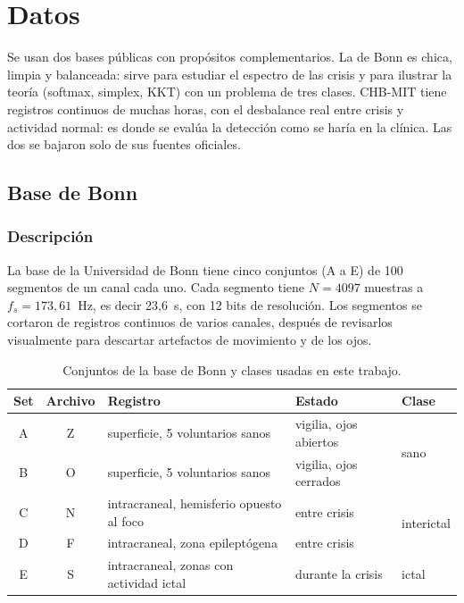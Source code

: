 \chapter{Datos}
\label{cap:datos}

Se usan dos bases públicas con propósitos complementarios. La de Bonn es chica, limpia y balanceada:
sirve para estudiar el espectro de las crisis y para ilustrar la teoría (softmax, simplex, KKT) con un
problema de tres clases. CHB-MIT tiene registros continuos de muchas horas, con el desbalance real entre
crisis y actividad normal: es donde se evalúa la detección como se haría en la clínica. Las dos se bajaron
solo de sus fuentes oficiales.

\section{Base de Bonn}
\label{sec:bonn}

\subsection{Descripción}

La base de la Universidad de Bonn \parencite{andrzejak2001} tiene cinco conjuntos (A a E) de 100 segmentos
de un canal cada uno. Cada segmento tiene $N = 4097$ muestras a $f_s = 173{,}61$~Hz, es decir 23,6~s, con
12 bits de resolución. Los segmentos se cortaron de registros continuos de varios canales, después de
revisarlos visualmente para descartar artefactos de movimiento y de los ojos.

\begin{table}[ht]
\centering
\caption{Conjuntos de la base de Bonn y clases usadas en este trabajo.}
\label{tab:bonn_sets}
\begin{tabular}{cclll}
\toprule
Set & Archivo & Registro & Estado & Clase \\
\midrule
A & Z & superficie, 5 voluntarios sanos & vigilia, ojos abiertos & \multirow{2}{*}{sano} \\
B & O & superficie, 5 voluntarios sanos & vigilia, ojos cerrados & \\
C & N & intracraneal, hemisferio opuesto al foco & entre crisis & \multirow{2}{*}{interictal} \\
D & F & intracraneal, zona epileptógena & entre crisis & \\
E & S & intracraneal, zonas con actividad ictal & durante la crisis & ictal \\
\bottomrule
\end{tabular}
\end{table}


